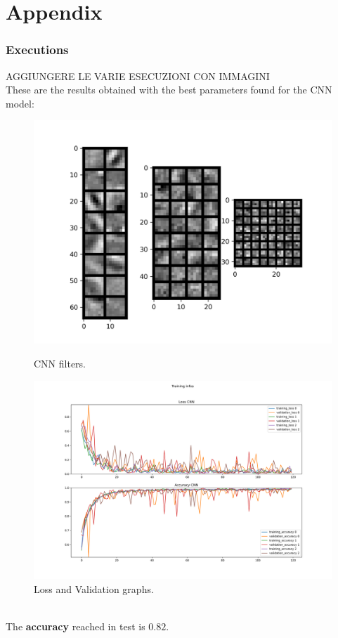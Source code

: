 \documentclass{report}
\begin{document}
\pagebreak

\part{Appendix}
\appendix

\section{Executions}
AGGIUNGERE LE VARIE ESECUZIONI CON IMMAGINI\\

These are the results obtained with the best parameters found for the CNN model:
\begin{figure}[ht!]
  \centering
  \begin{minipage}[b]{0.7\linewidth}
    \includegraphics[width=\linewidth]{3.CNN_500_sample/CNN_filters.png}
    \caption{CNN filters.}
    \label{fig:image1}
  \end{minipage}
  \hspace{0.5cm}
  \begin{minipage}[b]{0.7\linewidth}
    \includegraphics[width=\linewidth]{3.CNN_500_sample/training_infos.png}
    \caption{Loss and Validation graphs.}
    \label{fig:image2}
  \end{minipage}
\end{figure}\\
The \textbf{accuracy} reached in test is $0.82$.\\
\pagebreak
\end{document}
